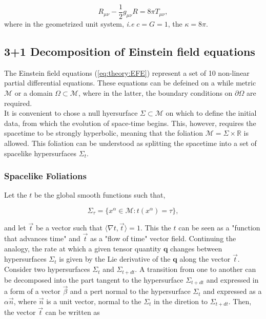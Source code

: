 \documentclass[11pt,a4paper,headinclude=true,DIV=14,BCOR=8mm,chapterprefix,listof=totoc,twoside,openright,abstracton]{scrbook}
\begin{document}
\begin{equation}
    R_{\mu\nu} -\frac{1}{2}g_{\mu\nu}R=8\pi T_{\mu\nu},
    \label{eq:theory:EFE}
\end{equation}
where in the geometrized unit system, \textit{i.e} $c=G=1$, the $\kappa=8\pi$.

\subsection{3+1 Decomposition of Einstein field equations}

The Einstein field equations (\ref{eq:theory:EFE}) represent a set of 10 non-linear partial differential equations. These equations can be defeined on a while metric $\mathcal{M}$ or a domain $\Omega\subset\mathcal{M}$, where in the latter, the boundary conditions on $\partial\Omega$ are required. \\
It is convenient to chose a null hyersurface $\Sigma\subset\mathcal{M}$ on which to define the initial data, from which the evolution of space-time begins. This, however, requires the spacetime to be strongly hyperbolic, meaning that the foliation $\mathcal{M}=\Sigma\times\mathbb{R}$ is allowed. This foliation can be understood as splitting the spacetime into a set of spacelike hypersurfaces $\Sigma_t$. 

\subsubsection{Spacelike Foliations}
Let the $t$ be the global smooth functions such that, 

\begin{equation}
    \Sigma_{\tau} = \{x^{\alpha}\in\mathcal{M}: t(x^{\alpha})=\tau\},
\end{equation}

and let $\vec{t}$ be a vector such that $\langle\nabla t, \vec{t}\rangle = 1$. This the $t$ can be seen as a "function that advances time" and $\vec{t}$ as a "flow of time" vector field. Continuing the analogy, the rate at which a given tensor quantity $\boldsymbol{q}$ changes between hypersurfaces $\Sigma_t$ is given by the Lie derivative of the $\boldsymbol{q}$ along the vector $\vec{t}$. \\

Consider two hypersurfaces $\Sigma_t$ and $\Sigma_{t+dt}$. A transition from one to another can be decomposed into the part tangent to the hypersurface $\Sigma_{t+dt}$ and expressed in a form of a vector $\vec{\beta}$ and a pert normal to the hypersurface $\Sigma_t$ and expressed as a $\alpha \vec{n}$, where $\vec{n}$ is a unit vector, normal to the $\Sigma_t$ in the diretion to $\Sigma_{t+dt}$. Then, the vector $\vec{t}$ can be written as 
\end{document}
